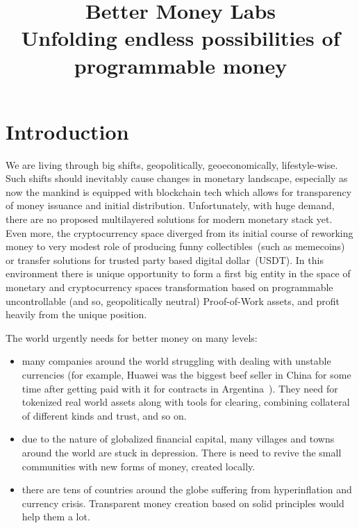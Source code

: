 \documentclass{llncs}   %
\begin{document}
\title{Better Money Labs\\ \small Unfolding endless possibilities of programmable money}

\author{}%

\maketitle

\section{Introduction}

We are living through big shifts, geopolitically, geoeconomically, lifestyle-wise. Such shifts should inevitably cause changes in monetary landscape, especially as now the mankind is equipped with blockchain tech which allows for transparency of money issuance and initial distribution.
Unfortunately, with huge demand, there are no proposed multilayered solutions for modern monetary stack yet. Even more, the cryptocurrency space diverged from its initial course of reworking money to very modest role of producing funny collectibles~(such as memecoins) or transfer solutions
 for trusted party based digital dollar~(USDT).
In this environment there is unique opportunity to form a first big entity in the space of monetary and cryptocurrency spaces transformation based on programmable
uncontrollable (and so, geopolitically neutral) Proof-of-Work assets, and profit heavily from the unique position.

The world urgently needs for better money on many levels:
\begin{itemize}
  \item many companies around the world struggling with dealing with unstable currencies (for example, Huawei was the biggest beef seller in China for some time after getting paid with it for contracts in Argentina~\cite{huawei}). They need for tokenized real world assets along with tools for clearing, combining collateral of different kinds and trust, and so on.
  \item due to the nature of globalized financial capital, many villages and towns around the world are stuck in depression. There is need to revive the small communities with new forms of money, created locally.
  \item there are tens of countries around the globe suffering from hyperinflation and currency crisis. Transparent money creation based on solid principles would help them a lot.
\end{itemize}
\end{document}
